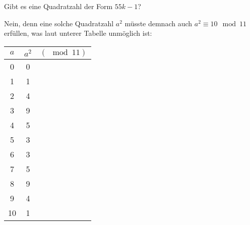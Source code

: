 
\begin{exercise}

Gibt es eine Quadratzahl der Form $55k -1$?

\end{exercise}


\begin{solution}

Nein, denn eine solche Quadratzahl $a^2$ müsste demnach auch $a^2 \equiv 10 \mod{11}$
erfüllen, was laut unterer Tabelle unmöglich ist:

\begin{center}
\begin{tabular}{c|cc}
    $a$ & $a^2$ & $(\mod{11})$\\
    \hline
    0 & 0 & \\
    1 & 1 & \\
    2 & 4 & \\
    3 & 9 & \\
    4 & 5 & \\
    5 & 3 & \\
    6 & 3 & \\
    7 & 5 & \\
    8 & 9 & \\
    9 & 4 & \\
    10 & 1 & \\
\end{tabular}
\end{center}

\end{solution}

